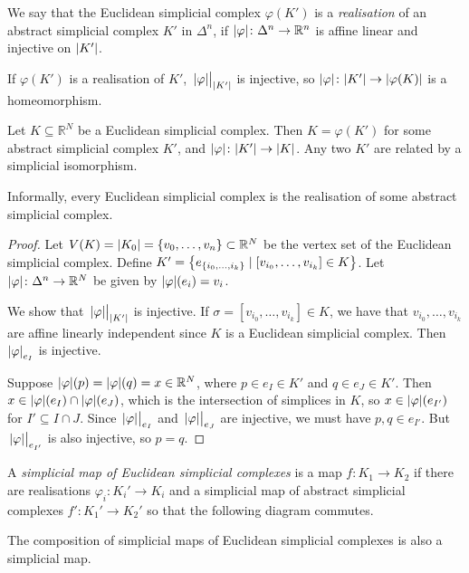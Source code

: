 \begin{definition}
	We say that the Euclidean simplicial complex \( \varphi(K') \) is a \emph{realisation} of an abstract simplicial complex \( K' \) in \( \Delta^n \), if \( \abs{\varphi} \colon \Delta^n \to \mathbb R^n \) is affine linear and injective on \( \abs{K'} \).
\end{definition}
\begin{remark}
	If \( \varphi(K') \) is a realisation of \( K' \), \( \eval{\abs{\varphi}}_{\abs{K'}} \) is injective, so \( \abs{\varphi} \colon \abs{K'} \to \abs{\varphi(K)} \) is a homeomorphism.
\end{remark}
\begin{proposition}
	Let \( K \subseteq \mathbb R^N \) be a Euclidean simplicial complex.
	Then \( K = \varphi(K') \) for some abstract simplicial complex \( K' \), and \( \abs{\varphi} \colon \abs{K'} \to \abs{K} \).
	Any two \( K' \) are related by a simplicial isomorphism.
\end{proposition}
Informally, every Euclidean simplicial complex is the realisation of some abstract simplicial complex.
\begin{proof}
	Let \( V(K) = \abs{K_0} = \qty{v_0, \dots, v_n} \subset \mathbb R^N \) be the vertex set of the Euclidean simplicial complex.
	Define \( K' = \qty{e_{\qty{i_0, \dots, i_k}} \mid [v_{i_0}, \dots, v_{i_k}] \in K} \).
	Let \( \abs{\varphi} \colon \Delta^n \to \mathbb R^N \) be given by \( \abs{\varphi}(e_i) = v_i \).

	We show that \( \eval{\abs{\varphi}}_{\abs{K'}} \) is injective.
	If \( \sigma = [v_{i_0}, \dots, v_{i_k}] \in K \), we have that \( v_{i_0}, \dots, v_{i_k} \) are affine linearly independent since \( K \) is a Euclidean simplicial complex.
	Then \( \abs{\varphi}_{e_I} \) is injective.

	Suppose \( \abs{\varphi}(p) = \abs{\varphi}(q) = x \in \mathbb R^N \), where \( p \in e_I \in K' \) and \( q \in e_J \in K' \).
	Then \( x \in \abs{\varphi}(e_I) \cap \abs{\varphi}(e_J) \), which is the intersection of simplices in \( K \), so \( x \in \abs{\varphi}(e_{I'}) \) for \( I' \subseteq I \cap J \).
	Since \( \eval{\abs{\varphi}}_{e_I} \) and \( \eval{\abs{\varphi}}_{e_J} \) are injective, we must have \( p, q \in e_{I'} \).
	But \( \eval{\abs{\varphi}}_{e_{I'}} \) is also injective, so \( p = q \).
\end{proof}
\begin{definition}
	A \emph{simplicial map of Euclidean simplicial complexes} is a map \( f \colon K_1 \to K_2 \) if there are realisations \( \varphi_i \colon K_i' \to K_i \) and a simplicial map of abstract simplicial complexes \( f' \colon K_1' \to K_2' \) so that the following diagram commutes.
\end{definition}
\begin{remark}
	The composition of simplicial maps of Euclidean simplicial complexes is also a simplicial map.
\end{remark}
